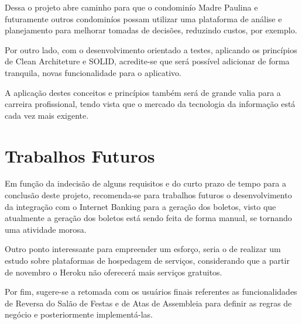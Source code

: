 \documentclass[12pt]{article}
\begin{document}
Dessa o projeto abre caminho para que o condominío Madre Paulina e futuramente outros condominíos possam utilizar uma plataforma de análise e planejamento para melhorar tomadas de decisões, reduzindo custos, por exemplo.

Por outro lado, com o desenvolvimento orientado a testes, aplicando os princípios de Clean Architeture e SOLID, acredite-se que será possível adicionar de forma tranquila, novas funcionalidade para o aplicativo. 

A aplicação destes conceitos e princípios também será de grande valia para a carreira profissional, tendo vista que o mercado da tecnologia da informação está cada vez mais exigente.

\section{Trabalhos Futuros}
Em função da indecisão de alguns requisitos e do curto prazo de tempo para a conclusão deste projeto, recomenda-se para trabalhos futuros o desenvolvimento da integração com o Internet Banking para a geração dos boletos, visto que atualmente a geração dos boletos  está sendo feita de forma manual, se tornando uma atividade morosa.

Outro ponto interessante para empreender um esforço, seria o de realizar um estudo sobre plataformas de hospedagem de serviços, considerando que a partir de novembro o Heroku não oferecerá mais serviços gratuitos.

Por fim, sugere-se a retomada com os usuários finais referentes as funcionalidades de Reversa do Salão de Festas e de Atas de Assembleia para definir as regras de negócio e posteriormente implementá-las.




\newpage 
\end{document}
